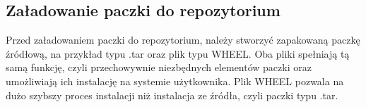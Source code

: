    \quad 
    
    
    \subsection{Załadowanie paczki do repozytorium}
    
    \quad Przed załadowaniem paczki do repozytorium, należy stworzyć zapakowaną paczkę źródłową, na przykład typu .tar oraz plik typu WHEEL. Oba pliki spełniają tą samą funkcję, czyli przechowywnie niezbędnych elementów paczki oraz umożliwiają ich instalację na systemie użytkownika. Plik WHEEL pozwala na dużo szybszy proces instalacji niż instalacja ze źródła, czyli paczki typu .tar. 
